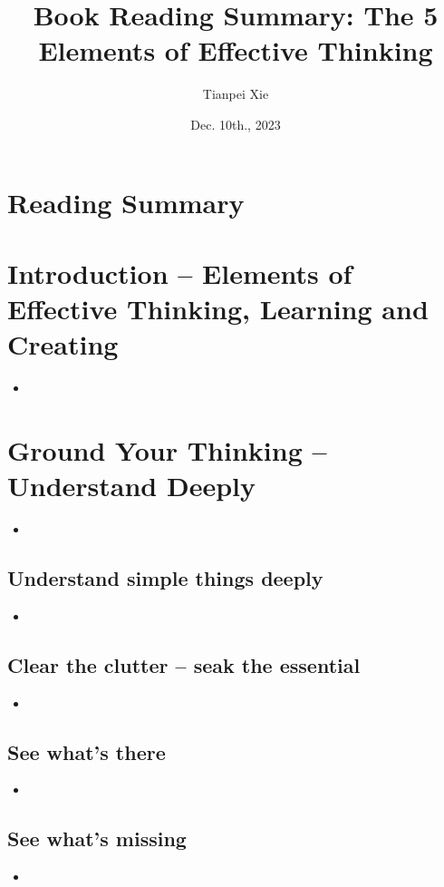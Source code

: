 \documentclass[11pt]{article}
\begin{document}
\title{Book Reading Summary: The 5 Elements of Effective Thinking}
\author{ Tianpei Xie}
\date{Dec. 10th., 2023}
\maketitle
\tableofcontents
\newpage
\section{Reading Summary}

\newpage
\section{Introduction -- Elements of Effective Thinking, Learning and Creating}
\begin{itemize}
\item
\end{itemize}

\section{Ground Your Thinking -- Understand Deeply}
\begin{itemize}
\item
\end{itemize}

\subsection{Understand simple things deeply}
\begin{itemize}
\item
\end{itemize}

\subsection{Clear the clutter -- seak the essential}
\begin{itemize}
\item
\end{itemize}

\subsection{See what's there}
\begin{itemize}
\item
\end{itemize}

\subsection{See what's missing}
\begin{itemize}
\item
\end{itemize}
\end{document}
